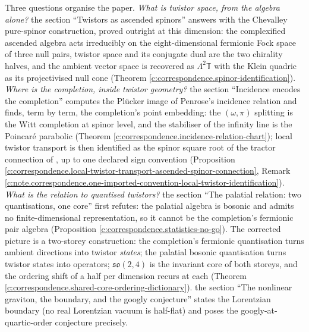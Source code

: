 \documentclass[11pt]{article}
\theoremstyle{definition}
\theoremstyle{plain}
\providecommand{\T}{}\renewcommand{\T}{\mathbb{T}}
\begin{document}
Three questions organise the paper. \emph{What is twistor space, from the algebra alone?} the section ``Twistors as ascended spinors'' answers with the Chevalley pure-spinor construction, proved outright at this dimension: the complexified ascended algebra acts irreducibly on the eight-dimensional fermionic Fock space of three null pairs, twistor space and its conjugate dual are the two chirality halves, and the ambient vector space is recovered as $\Lambda^2\T$ with the Klein quadric as its projectivised null cone (Theorem \ref{c:correspondence.spinor-identification}). \emph{Where is the completion, inside twistor geometry?} the section ``Incidence encodes the completion'' computes the Pl\"ucker image of Penrose's incidence relation and finds, term by term, the completion's point embedding: the $(\omega,\pi)$ splitting is the Witt completion at spinor level, and the stabiliser of the infinity line is the Poincar\'e parabolic (Theorem \ref{c:correspondence.incidence-relation-chart}); local twistor transport is then identified as the spinor square root of the tractor connection of \cite{ButlerT6}, up to one declared sign convention (Proposition \ref{c:correspondence.local-twistor-transport-ascended-spinor-connection}, Remark \ref{c:note.correspondence.one-imported-convention-local-twistor-identification}). \emph{What is the relation to quantised twistors?} the section ``The palatial relation: two quantisations, one core'' first refutes: the palatial algebra is bosonic and admits no finite-dimensional representation, so it cannot be the completion's fermionic pair algebra (Proposition \ref{c:correspondence.statistics-no-go}). The corrected picture is a two-storey construction: the completion's fermionic quantisation turns ambient directions into twistor \emph{states}; the palatial bosonic quantisation turns twistor states into operators; $\mathfrak{so}(2,4)$ is the invariant core of both storeys, and the ordering shift of a half per dimension recurs at each (Theorem \ref{c:correspondence.shared-core-ordering-dictionary}). the section ``The nonlinear graviton, the boundary, and the googly conjecture'' states the Lorentzian boundary (no real Lorentzian vacuum is half-flat) and poses the googly-at-quartic-order conjecture precisely.
\end{document}
